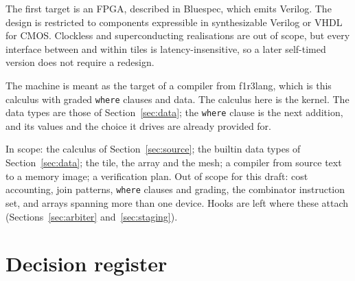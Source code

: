 \documentclass[11pt]{article}
\newcommand{\kw}[1]{\texttt{#1}}
\theoremstyle{definition}
\theoremstyle{remark}
\begin{document}
The first target is an FPGA, described in Bluespec, which emits Verilog. The
design is restricted to components expressible in synthesizable Verilog or
VHDL for CMOS. Clockless and superconducting realisations are out of scope,
but every interface between and within tiles is latency-insensitive, so a
later self-timed version does not require a redesign.

The machine is meant as the target of a compiler from f1r3lang, which is
this calculus with graded \kw{where} clauses and data. The calculus here is
the kernel. The data types are those of Section~\ref{sec:data}; the
\kw{where} clause is the next addition, and its values and the choice it
drives are already provided for.

In scope: the calculus of Section~\ref{sec:source}; the builtin data types
of Section~\ref{sec:data}; the tile, the array and
the mesh; a compiler from source text to a memory image; a verification
plan. Out of scope for this draft: cost accounting, join patterns,
\kw{where} clauses and grading, the combinator instruction set, and
arrays spanning more than one device. Hooks are left where these attach
(Sections~\ref{sec:arbiter} and~\ref{sec:staging}).

\section{Decision register}\label{sec:decisions}
\end{document}
